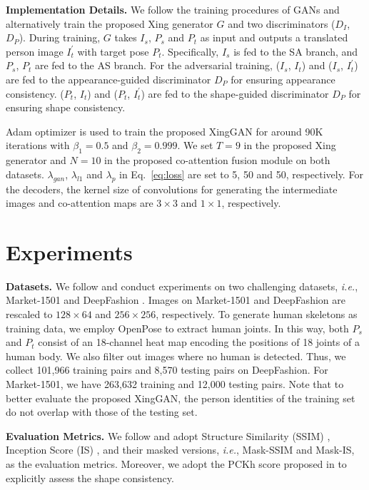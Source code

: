 \documentclass[runningheads]{llncs}
\begin{document}
\noindent \textbf{Implementation Details.}
We follow the training procedures of GANs and alternatively train the proposed Xing generator $G$ and two discriminators ($D_I$, $D_P$).
During training, $G$ takes $I_s$, $P_s$ and $P_t$ as input and outputs a translated person image $I_t^{'}$ with target pose $P_t$.
Specifically, $I_s$ is fed to the SA branch, and $P_s$, $P_t$ are fed to the AS branch.
For the adversarial training, ($I_s$, $I_t$) and ($I_s$, $I_t^{'}$) are fed to the appearance-guided discriminator $D_P$ for ensuring appearance consistency.
($P_t$, $I_t$) and ($P_t$, $I_t^{'}$) are fed to the shape-guided discriminator $D_P$ for ensuring shape consistency.

Adam optimizer \cite{kingma2014adam} is used to train the proposed XingGAN for around 90K iterations with $\beta_1{=}0.5$ and $\beta_2{=}0.999$.
We set $T{=}9$ in the proposed Xing generator and $N{=}10$ in the proposed co-attention fusion module on both datasets.
$\lambda_{gan}$, $\lambda_{l1}$ and $\lambda_{p}$ in Eq.~\eqref{eq:loss} are set to 5, 50 and 50, respectively.
For the decoders, the kernel size of convolutions for generating the intermediate images and co-attention maps are $3 {\times} 3$ and $1 {\times} 1$, respectively.
 \section{Experiments}

\noindent \textbf{Datasets.}
We follow \cite{ma2017pose,siarohin2018deformable,zhu2019progressive} and conduct experiments on two challenging datasets, \emph{i.e.}, Market-1501 \cite{zheng2015scalable} and DeepFashion \cite{liu2016deepfashion}.
Images on Market-1501 and DeepFashion are rescaled to $128 {\times} 64$ and $256 {\times} 256$, respectively.
To generate human skeletons as training data, we employ OpenPose \cite{cao2017realtime} to extract human joints. 
In this way, both $P_s$ and $P_t$ consist of an 18-channel heat map encoding the positions of 18 joints of a human body.
We also filter out images where no human is detected.
Thus, we collect 101,966 training pairs and 8,570 testing pairs on DeepFashion.
For Market-1501, we have 263,632 training and 12,000 testing pairs. 
Note that to better evaluate the proposed XingGAN, the person identities of the training set do not overlap with those of the testing set.

\noindent \textbf{Evaluation Metrics.}
We follow \cite{ma2017pose,siarohin2018deformable,zhu2019progressive} and adopt Structure Similarity (SSIM) \cite{wang2004image}, Inception Score (IS) \cite{salimans2016improved}, and their masked versions, \emph{i.e.}, Mask-SSIM and Mask-IS, as the evaluation metrics.
Moreover, we adopt the PCKh score proposed in \cite{zhu2019progressive} to explicitly assess the shape consistency.
\end{document}
